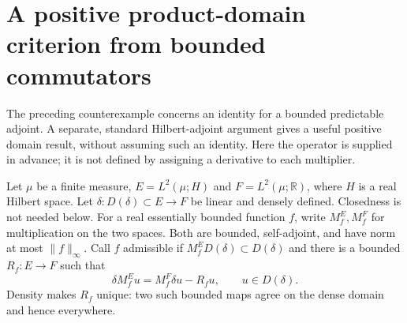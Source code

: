 \documentclass[11pt]{article}
\newcommand{\R}{\mathbb R}
\begin{document}
\section{A positive product-domain criterion from bounded commutators}
The preceding counterexample concerns an identity for a bounded predictable
adjoint. A separate, standard Hilbert-adjoint argument gives a useful positive
domain result, without assuming such an identity. Here the operator is supplied
in advance; it is not defined by assigning a derivative to each multiplier.

Let $\mu$ be a finite measure, $E=L^2(\mu;H)$ and $F=L^2(\mu;\R)$,
where $H$ is a real Hilbert space. Let $\delta:D(\delta)\subset E\to F$
be linear and densely defined. Closedness is not needed below.
For a real essentially bounded function $f$, write $M_f^E,M_f^F$
for multiplication on the two spaces. Both are bounded, self-adjoint,
and have norm at most $\|f\|_\infty$.
Call $f$ admissible if $M_f^E D(\delta)\subset D(\delta)$ and there
is a bounded $R_f:E\to F$ such that
\begin{equation}\label{eq:multcomm}
 \delta M_f^E u=M_f^F\delta u-R_fu,\qquad u\in D(\delta).
\end{equation}
Density makes $R_f$ unique: two such bounded maps agree on the dense
domain and hence everywhere.
\end{document}
